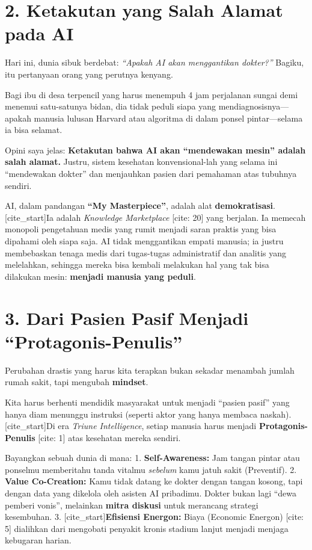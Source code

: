 \documentclass[
  letterpaper,
  DIV=11,
  numbers=noendperiod]{scrreprt}
\begin{document}
\section{2. Ketakutan yang Salah Alamat pada
AI}\label{ketakutan-yang-salah-alamat-pada-ai}

Hari ini, dunia sibuk berdebat: \emph{``Apakah AI akan menggantikan
dokter?''} Bagiku, itu pertanyaan orang yang perutnya kenyang.

Bagi ibu di desa terpencil yang harus menempuh 4 jam perjalanan sungai
demi menemui satu-satunya bidan, dia tidak peduli siapa yang
mendiagnosisnya---apakah manusia lulusan Harvard atau algoritma di dalam
ponsel pintar---selama ia bisa selamat.

Opini saya jelas: \textbf{Ketakutan bahwa AI akan ``mendewakan mesin''
adalah salah alamat.} Justru, sistem kesehatan konvensional-lah yang
selama ini ``mendewakan dokter'' dan menjauhkan pasien dari pemahaman
atas tubuhnya sendiri.

AI, dalam pandangan \textbf{``My Masterpiece''}, adalah alat
\textbf{demokratisasi}. {[}cite\_start{]}Ia adalah \emph{Knowledge
Marketplace} {[}cite: 20{]} yang berjalan. Ia memecah monopoli
pengetahuan medis yang rumit menjadi saran praktis yang bisa dipahami
oleh siapa saja. AI tidak menggantikan empati manusia; ia justru
membebaskan tenaga medis dari tugas-tugas administratif dan analitis
yang melelahkan, sehingga mereka bisa kembali melakukan hal yang tak
bisa dilakukan mesin: \textbf{menjadi manusia yang peduli}.

\section{3. Dari Pasien Pasif Menjadi
``Protagonis-Penulis''}\label{dari-pasien-pasif-menjadi-protagonis-penulis}

Perubahan drastis yang harus kita terapkan bukan sekadar menambah jumlah
rumah sakit, tapi mengubah \textbf{mindset}.

Kita harus berhenti mendidik masyarakat untuk menjadi ``pasien pasif''
yang hanya diam menunggu instruksi (seperti aktor yang hanya membaca
naskah). {[}cite\_start{]}Di era \emph{Triune Intelligence}, setiap
manusia harus menjadi \textbf{Protagonis-Penulis} {[}cite: 1{]} atas
kesehatan mereka sendiri.

Bayangkan sebuah dunia di mana: 1. \textbf{Self-Awareness:} Jam tangan
pintar atau ponselmu memberitahu tanda vitalmu \emph{sebelum} kamu jatuh
sakit (Preventif). 2. \textbf{Value Co-Creation:} Kamu tidak datang ke
dokter dengan tangan kosong, tapi dengan data yang dikelola oleh asisten
AI pribadimu. Dokter bukan lagi ``dewa pemberi vonis'', melainkan
\textbf{mitra diskusi} untuk merancang strategi kesembuhan. 3.
{[}cite\_start{]}\textbf{Efisiensi Energon:} Biaya (Economic Energon)
{[}cite: 5{]} dialihkan dari mengobati penyakit kronis stadium lanjut
menjadi menjaga kebugaran harian.
\end{document}
